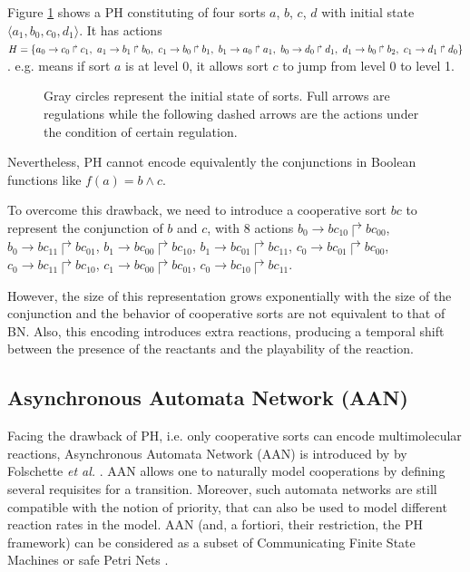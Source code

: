\begin{example}
Figure \ref{fig:PH} shows a PH constituting of four sorts $a$, $b$, $c$, $d$ with initial state $\langle a_1,b_0,c_0,d_1\rangle$. 
It has actions $H=\{\acmph{a_0}{c_0}{c_1},\ \acmph{a_1}{b_1}{b_0},\ \acmph{c_1}{b_0}{b_1},\ \acmph{b_1}{a_0}{a_1},\ \acmph{b_0}{d_0}{d_1},\ \acmph{d_1}{b_0}{b_2},\ \acmph{c_1}{d_1}{d_0}\}$. 
e.g.  means if sort $a$ is at level 0, it allows sort $c$ to jump from level 0 to level 1.
\end{example}

\begin{figure}[ht]
\centering

\caption[Process Hitting]{Gray circles represent the initial state of sorts.
Full arrows are regulations while the following dashed arrows are the actions under the condition of certain regulation.}\label{fig:PH}
\end{figure}

Nevertheless, PH cannot encode equivalently the conjunctions in Boolean functions like $f(a)=b\land c$.

To overcome this drawback, we need to introduce a cooperative sort $bc$ to represent the conjunction of $b$ and $c$, with 8 actions $b_0\to bc_{10}\Rsh bc_{00}$, $b_0\to bc_{11}\Rsh bc_{01}$, $b_1\to bc_{00}\Rsh bc_{10}$, $b_1\to bc_{01}\Rsh bc_{11}$, $c_0\to bc_{01}\Rsh bc_{00}$, $c_0\to bc_{11}\Rsh bc_{10}$, $c_1\to bc_{00}\Rsh bc_{01}$, $c_0\to bc_{10}\Rsh bc_{11}$.

However, the size of this representation grows exponentially with the size of the conjunction and the behavior of cooperative sorts are not equivalent to that of BN. 
Also, this encoding introduces extra reactions, producing a temporal shift between the presence of the reactants and the playability of the reaction.

\subsection{Asynchronous Automata Network (AAN)}
Facing the drawback of PH, i.e. only cooperative sorts can encode multimolecular reactions, Asynchronous Automata Network (AAN) is introduced by by Folschette \textit{et al.} \cite{folschette2015}.
AAN allows one to naturally model cooperations by defining several requisites for a transition.
Moreover, such automata networks are still compatible with the notion of priority, that can also be used to model different reaction rates in the model.
AAN (and, a fortiori, their restriction, the PH framework) can be considered as a subset of Communicating Finite State Machines or safe Petri Nets \cite{pauleve2012process}.

